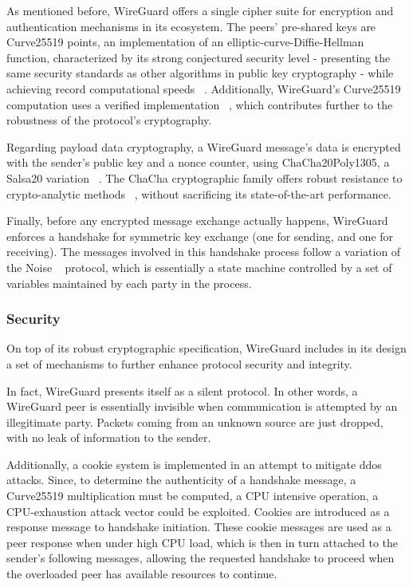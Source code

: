 \documentclass[11pt,twoside,a4paper]{report}
\begin{document}
As mentioned before, WireGuard offers a single cipher suite for encryption and authentication mechanisms in its ecosystem. The peers' pre-shared keys are Curve25519 points, an implementation of an elliptic-curve-Diffie-Hellman function, characterized by its strong conjectured security level - presenting the same security standards as other algorithms in public key cryptography - while achieving record computational speeds ~\cite{bernstein2006curve25519}. Additionally, WireGuard's Curve25519 computation uses a verified implementation ~\cite{zinzindohoue2017hacl}, which contributes further to the robustness of the protocol's cryptography.

Regarding payload data cryptography, a WireGuard message's data is encrypted with the sender's public key and a nonce counter, using ChaCha20Poly1305, a Salsa20 variation ~\cite{bernstein2008chacha}. The ChaCha cryptographic family offers robust resistance to crypto-analytic methods ~\cite{cryptoeprint:2014/613}, without sacrificing its state-of-the-art performance.

Finally, before any encrypted message exchange actually happens, WireGuard enforces a handshake for symmetric key exchange (one for sending, and one for receiving). The messages involved in this handshake process follow a variation of the Noise ~\cite{perrin2018noise} protocol, which is essentially a state machine controlled by a set of variables maintained by each party in the process.

\subsubsection{Security}

On top of its robust cryptographic specification, WireGuard includes in its design a set of mechanisms to further enhance protocol security and integrity.

In fact, WireGuard presents itself as a silent protocol. In other words, a WireGuard peer is essentially invisible when communication is attempted by an illegitimate party. Packets coming from an unknown source are just dropped, with no leak of information to the sender.

Additionally, a cookie system is implemented in an attempt to mitigate \ac{ddos} attacks. Since, to determine the authenticity of a handshake message, a Curve25519 multiplication must be computed, a CPU intensive operation, a CPU-exhaustion attack vector could be exploited. Cookies are introduced as a response message to handshake initiation. These cookie messages are used as a peer response when under high CPU load, which is then in turn attached to the sender's following messages, allowing the requested handshake to proceed when the overloaded peer has available resources to continue.
\end{document}
